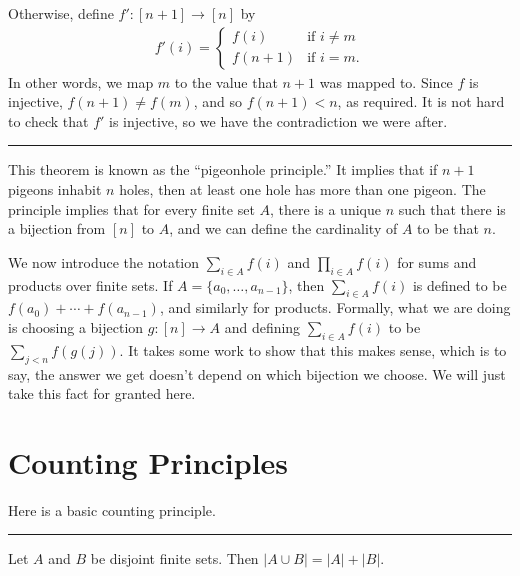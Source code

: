 \documentclass[letterpaper,10pt,english]{sphinxmanual}
\begin{document}
\sphinxAtStartPar
Otherwise, define \(f' : [n+1] \to [n]\) by
\begin{equation*}
\begin{split}f'(i) =
  \begin{cases}
    f(i) & \mbox{if $i \neq m$} \\
    f(n+1) & \mbox{if $i = m$.}
  \end{cases}\end{split}
\end{equation*}
\sphinxAtStartPar
In other words, we map \(m\) to the value that \(n+1\) was mapped to. Since \(f\) is injective, \(f(n+1) \neq f(m)\), and so \(f(n+1) < n\), as required. It is not hard to check that \(f'\) is injective, so we have the contradiction we were after.


\bigskip\hrule\bigskip


\sphinxAtStartPar
This theorem is known as the “pigeonhole principle.” It implies that if \(n + 1\) pigeons inhabit \(n\) holes, then at least one hole has more than one pigeon. The principle implies that for every finite set \(A\), there is a unique \(n\) such that there is a bijection from \([n]\) to \(A\), and we can define the cardinality of \(A\) to be that \(n\).

\sphinxAtStartPar
We now introduce the notation \(\sum_{i \in A} f(i)\) and \(\prod_{i \in A} f(i)\) for sums and products over finite sets. If \(A = \{ a_0, \ldots, a_{n-1} \}\), then \(\sum_{i \in A} f(i)\) is defined to be \(f(a_0) + \cdots + f(a_{n-1})\), and similarly for products. Formally, what we are doing is choosing a bijection \(g : [n] \to A\) and defining \(\sum_{i \in A} f(i)\) to be \(\sum_{j < n} f(g(j))\). It takes some work to show that this makes sense, which is to say, the answer we get doesn’t depend on which bijection we choose. We will just take this fact for granted here.


\section{Counting Principles}
\label{\detokenize{combinatorics:counting-principles}}\label{\detokenize{combinatorics:id2}}
\sphinxAtStartPar
Here is a basic counting principle.


\bigskip\hrule\bigskip


\sphinxAtStartPar
{} Let \(A\) and \(B\) be disjoint finite sets. Then \(| A \cup B | = | A | + | B |\).
\end{document}
